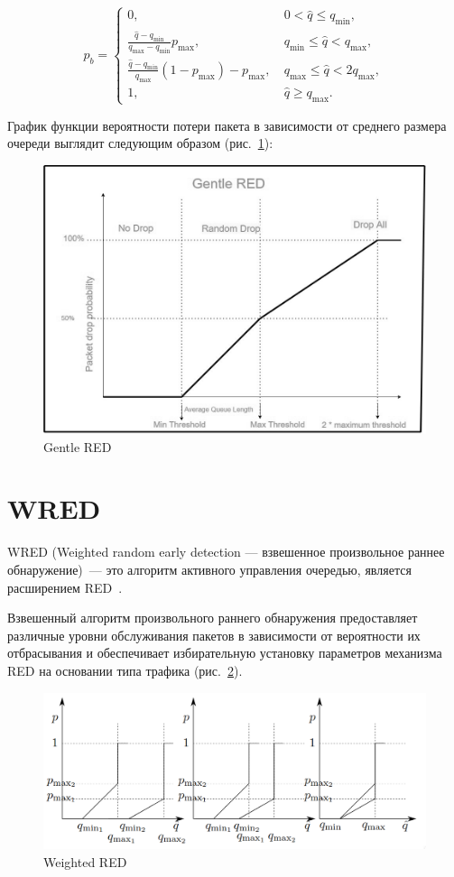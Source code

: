 \begin{equation}
\label{gred}
p_{b} =\begin{cases}
        0, &  \  0 < \hat{q} \leqslant q_{\min}, 
        \\
        \frac{\hat{q} - q_{\min}}{q_{\max} - q_{\min}} p_{\max}, & \ q_{\min} \leqslant \hat{q} < q_{\max}, 
        \\
        \frac{\hat{q} - q_{\min}}{q_{\max}}(1-p_{\max}) - p_{\max}, & \ q_{\max} \leqslant \hat{q} < 2q_{\max}, 
        \\
        1, &  \ \hat{q} \geqslant  q_{\max}.
\end{cases}
\end{equation}

График функции вероятности потери пакета в зависимости от среднего
размера очереди выглядит следующим образом (рис.~\ref{fig:2.2}):

\begin{figure}[!h]
  \centering
  \includegraphics[width=0.7\linewidth]{image/GentleRED.jpg}
  \caption{Gentle RED}
  \label{fig:2.2}
\end{figure}

\section{WRED}

WRED (Weighted random early detection --- взвешенное произвольное раннее
обнаружение)~--- это алгоритм активного управления очередью, является
расширением RED~\cite{WRED}.

Взвешенный алгоритм произвольного раннего обнаружения предоставляет
различные уровни обслуживания пакетов в зависимости от вероятности их
отбрасывания и обеспечивает избирательную установку параметров
механизма RED на основании типа трафика (рис.~\ref{fig:2.3}).

\begin{figure}[!h]
  \centering
  \includegraphics[width=0.7\linewidth]{image/wred.png}
  \caption{Weighted RED}
  \label{fig:2.3}
\end{figure}

